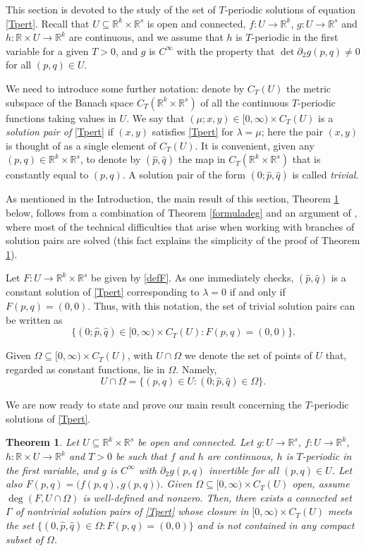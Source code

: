 \documentclass[a4paper]{amsart}
\numberwithin{equation}{section}
\newtheorem{theorem}{Theorem}[section]
\newcommand{\R}{\mathbb{R}}
\begin{document}
This section is devoted to the study of the set of $T$-periodic solutions of equation
\eqref{Tpert}. Recall that $U\subseteq\R^k\times\R^s$ is open and connected, $f:U\to\R^k$, 
$g:U\to\R^s$ and $h:\R\times U\to\R^k$ are continuous, and we assume that $h$ is $T$-periodic 
in the first variable for a given $T>0$, and $g$ is $C^\infty$ with the property that  $\det\partial_2g(p,q)\neq 0$ for all $(p,q)\in U$.

We need to introduce some further notation: denote by $C_T(U)$ the metric subspace of 
the Banach space $C_T(\R^k\times\R^s)$ of all the continuous $T$-periodic functions taking 
values in $U$. We say that $(\mu;x,y)\in [0,\infty)\times C_T(U)$ is a \emph{solution pair 
of} \eqref{Tpert} if $(x,y)$ satisfies \eqref{Tpert} for $\lambda=\mu$; here the pair 
$(x,y)$ is thought of as a single element of $C_T(U)$.  It is convenient, given any 
$(p,q)\in\R^k\times\R^s$, to denote by $(\hat p,\hat q)$ the map in 
$C_T(\R^k\times\R^s)$ that is constantly equal to $(p,q)$. A solution pair of the form
$(0;\hat p,\hat q)$ is called \emph{trivial}. 

As mentioned in the Introduction, the main result of this section, Theorem \ref{rami}
below, follows from a combination of Theorem \ref{formuladeg} and an argument of 
\cite{FS98}, where most of the technical difficulties that arise when working with 
branches of solution pairs are solved (this fact explains the simplicity of the proof
of Theorem \ref{rami}). 

Let $F:U\to\R^k\times\R^s$ be given by 
\eqref{defF}. As one immediately checks, $(\hat p,\hat q)$ is a constant solution of 
\eqref{Tpert} corresponding to $\lambda=0$ if and only if $F(p,q)=(0,0)$. Thus, with this 
notation, the set of trivial solution pairs can be written as 
\[
\{(0;\hat p,\hat q)\in [0,\infty)\times C_T(U): F(p,q)=(0,0)\}.
\] 

Given $\Omega\subseteq[0,\infty)\times C_T(U)$, with $U\cap\Omega$ we denote the set of 
points of $U$ that, regarded as constant functions, lie in $\Omega$. Namely,
\[
  U\cap\Omega=\{(p,q)\in U: (0;\hat p,\hat q)\in\Omega\}.
\]

We are now ready to state and prove our main result concerning the $T$-periodic solutions
of  \eqref{Tpert}. 

\begin{theorem}\label{rami}
Let $U\subseteq\R^k\times\R^s$ be open and connected. Let $g:U\to\R^s$, $f:U\to\R^k$,
$h:\R\times U\to\R^k$ and $T>0$ be such that $f$ and $h$ are continuous, $h$ is 
$T$-periodic in the first variable,
and $g$ is $C^\infty$ with $\partial_2g(p,q)$ invertible for all $(p,q)\in U$. Let also 
$F(p,q)=\big(f(p,q),g(p,q)\big)$. Given $\Omega\subseteq[0,\infty)\times C_T(U)$ open, 
assume $\deg(F,U\cap\Omega)$ is well-defined and nonzero. Then, there exists a 
connected set $\Gamma$ of nontrivial solution pairs of \eqref{Tpert} whose closure in 
$[0,\infty)\times C_T(U)$ meets the set $\{(0,\hat p,\hat q)\in\Omega:F(p,q)=(0,0)\}$ 
and is not contained in any compact subset of $\Omega$.
\end{theorem}
\end{document}
